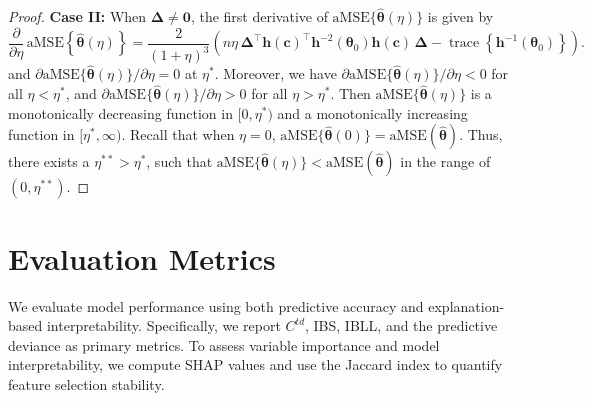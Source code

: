 \documentclass{article}
\theoremstyle{plain}
\theoremstyle{definition}
\theoremstyle{remark}
\begin{document}
\begin{proof}
\textbf{Case II:}
When $\boldsymbol{\Delta}\neq \boldsymbol{0}$, the first derivative of $\mathrm{aMSE}\{\hat{\boldsymbol{\theta}}(\eta)\}$ is given by
\begin{equation*}
\frac{\partial}{\partial \eta}\,\mathrm{aMSE}\!\left\{\hat{\boldsymbol{\theta}}(\eta)\right\}
= \frac{2}{(1+\eta)^3}\left(
n\eta\,\boldsymbol{\Delta}^\top \boldsymbol{h}(\boldsymbol{c})^\top
\boldsymbol{h}^{-2}(\boldsymbol{\theta}_0)
\boldsymbol{h}(\boldsymbol{c})\,\boldsymbol{\Delta}
- \operatorname{trace}\!\left\{\boldsymbol{h}^{-1}(\boldsymbol{\theta}_0)\right\}
\right).
\end{equation*}
and ${\partial \mathrm{aMSE}\{\widehat{\bm{\theta}}(\eta)\}}/{\partial \eta}=0$ at 
$\eta^*$. 
Moreover, we have ${\partial \mathrm{aMSE}\{\widehat{\bm{\theta}}(\eta)\}}/{\partial \eta}<0$ for all $\eta < \eta^*$, and ${\partial \mathrm{aMSE}\{\widehat{\bm{\theta}}(\eta)\}}/{\partial \eta}>0$ for all $\eta > \eta^*$. Then $\mathrm{aMSE}\{\widehat{\bm{\theta}}(\eta)\}$ is a monotonically decreasing function in $[0,\eta^*)$ and a monotonically increasing function in $[\eta^*, \infty)$. 
Recall that when $\eta=0$, $\mathrm{aMSE}\{\widehat{\bm{\theta}}(0)\}=\mathrm{aMSE} (\widehat{\bm{\theta}})$. Thus, there exists a %
$\eta^{**}>\eta^{*}$, such that $\mathrm{aMSE}\{\widehat{\bm{\theta}}(\eta)\}<\mathrm{aMSE} (\widehat{\bm{\theta}})$ in the range of $(0,\eta^{**})$.
\end{proof}


\section{Evaluation Metrics}
\label{A.Metrics}
We evaluate model performance using both predictive accuracy and explanation-based interpretability. Specifically, we report $C^{td}$, IBS, IBLL, and the predictive deviance as primary metrics.
To assess variable importance and model interpretability, we compute SHAP values and use the Jaccard index to quantify feature selection stability.
\end{document}

